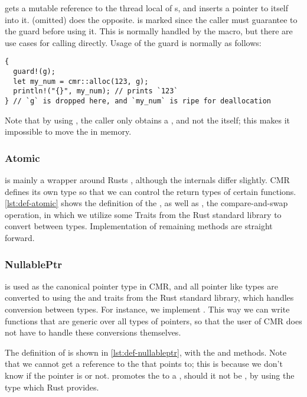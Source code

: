  gets a mutable reference to the thread local  of s,
and inserts a pointer to itself into it.  (omitted) does the opposite.
 is marked  since the caller must guarantee to  the
guard before using it. This is normally handled by the  macro, but there are use cases
for calling  directly. Usage of the guard is normally as follows:
\begin{lstlisting}[style=Rust]
{
  guard!(g);
  let my_num = cmr::alloc(123, g);
  println!("{}", my_num); // prints `123`
} // `g` is dropped here, and `my_num` is ripe for deallocation
\end{lstlisting}
Note that by using , the caller only obtains a , and not the
 itself; this makes it impossible to move the  in memory.


\subsubsection{Atomic}

 is mainly a wrapper around Rusts , although the internals differ
slightly. CMR defines its own type so that we can control the return types of certain functions.
\cref{lst:def-atomic} shows the definition of the , as well as , the
compare-and-swap operation, in which we utilize some Traits from the Rust standard library to
convert between types.  Implementation of remaining methods are straight forward.



\pagebreak
\subsubsection{NullablePtr}

 is used as the canonical pointer type in CMR, and all pointer like types are
converted to  using the  and  traits from the Rust standard
library, which handles conversion between types. For instance, we implement . This way we can write functions that are generic over all types of pointers, so
that the user of CMR does not have to handle these conversions themselves.


The definition of  is shown in \cref{lst:def-nullableptr}, with the 
and  methods. Note that we cannot get a reference to the  that 
points to; this is because we don't know if the pointer is  or not.  promotes
the  to a , should it not be , by using the 
type which Rust provides.

